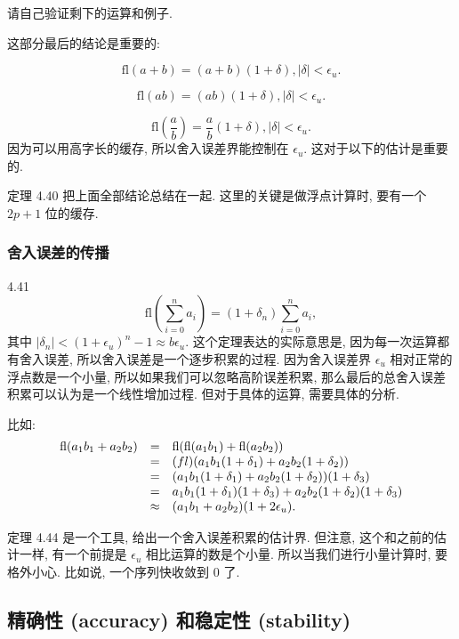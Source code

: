 \documentclass[a4paper]{ctexart}
\begin{document}
请自己验证剩下的运算和例子.

这部分最后的结论是重要的:

$$
\mbox{fl}(a + b) = (a + b)(1 + \delta), |\delta| < \epsilon_u.
$$

$$
\mbox{fl}(ab) = (ab)(1 + \delta), |\delta| < \epsilon_u.
$$

$$
\mbox{fl}(\frac{a}{b}) = \frac{a}{b}(1 + \delta), |\delta| < \epsilon_u.
$$
因为可以用高字长的缓存, 所以舍入误差界能控制在 $\epsilon_u$.
这对于以下的估计是重要的. 

定理 4.40 把上面全部结论总结在一起. 这里的关键是做浮点计算时,
要有一个 $2p + 1$ 位的缓存.

\subsubsection{舍入误差的传播}

 4.41
$$
\mbox{fl}\left(\sum_{i = 0}^n a_i\right) = (1 + \delta_n)\sum_{i = 0}^n a_i,
$$
其中 $|\delta_n| < (1 + \epsilon_u)^n - 1 \approx b \epsilon_u$.
这个定理表达的实际意思是, 因为每一次运算都有舍入误差, 所以舍入误差是一个逐步积累的过程.
因为舍入误差界 $\epsilon_u$ 相对正常的浮点数是一个小量, 所以如果我们可以忽略高阶误差积累,
那么最后的总舍入误差积累可以认为是一个线性增加过程. 但对于具体的运算, 需要具体的分析.

比如:
$$
\begin{array}{rcl}
  \mbox{fl}(a_1b_1 + a_2b_2) &=& \mbox{fl}(\mbox{fl}(a_1b_1) + \mbox{fl}(a_2b_2)) \\
  &=&\mbox(fl)(a_1b_1(1 + \delta_1) + a_2b_2(1 + \delta_2))\\
  &=&(a_1b_1(1+ \delta_1) + a_2b_2(1 + \delta_2))(1 + \delta_3) \\
  &=&a_1b_1(1 + \delta_1)(1 + \delta_3) + a_2b_2(1 + \delta_2)(1 + \delta_3)\\
  &\approx&(a_1b_1 + a_2b_2)(1 + 2\epsilon_u).
\end{array}
$$

定理 4.44 是一个工具, 给出一个舍入误差积累的估计界. 但注意, 这个和之前的估计一样,
有一个前提是 $\epsilon_u$ 相比运算的数是个小量. 所以当我们进行小量计算时, 要格外小心.
比如说, 一个序列快收敛到 $0$ 了.

\subsection{精确性 (accuracy) 和稳定性 (stability)}
\end{document}
